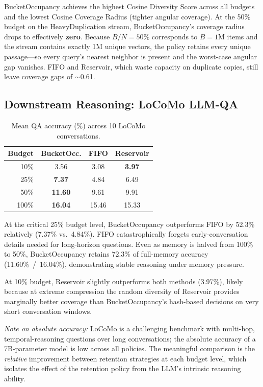 \documentclass[conference]{IEEEtran}
\begin{document}
BucketOccupancy achieves the highest Cosine Diversity Score across all
budgets and the lowest Cosine Coverage Radius (tighter angular
coverage). At the 50\% budget on the HeavyDuplication stream,
BucketOccupancy's coverage radius drops to effectively \textbf{zero}.
Because $B/N{=}50\%$ corresponds to $B{=}1$M items and the stream
contains exactly 1M unique vectors, the policy retains every unique
passage---so every query's nearest neighbor is present and the
worst-case angular gap vanishes. FIFO and Reservoir, which waste
capacity on duplicate copies, still leave coverage gaps of $\sim$0.61.

\subsection{Downstream Reasoning: LoCoMo LLM-QA}

\begin{table}[h]
\centering
\caption{Mean QA accuracy (\%) across 10 LoCoMo conversations.}
\label{tab:locomo}
\begin{tabular}{@{}rccc@{}}
\toprule
Budget & BucketOcc. & FIFO & Reservoir \\
\midrule
 10\% &  3.56 &  3.08 & \textbf{3.97} \\
 25\% & \textbf{7.37} &  4.84 &  6.49 \\
 50\% & \textbf{11.60} &  9.61 &  9.91 \\
100\% & \textbf{16.04} & 15.46 & 15.33 \\
\bottomrule
\end{tabular}
\end{table}

At the critical 25\% budget level, BucketOccupancy outperforms FIFO by
52.3\% relatively (7.37\% vs.\ 4.84\%). FIFO catastrophically forgets
early-conversation details needed for long-horizon questions. Even as
memory is halved from 100\% to 50\%, BucketOccupancy retains 72.3\% of
full-memory accuracy (11.60\%~/~16.04\%), demonstrating stable reasoning
under memory pressure.

At 10\% budget, Reservoir slightly outperforms both methods (3.97\%),
likely because at extreme compression the random diversity of Reservoir
provides marginally better coverage than BucketOccupancy's hash-based
decisions on very short conversation windows.

\textit{Note on absolute accuracy:} LoCoMo is a challenging benchmark
with multi-hop, temporal-reasoning questions over long conversations;
the absolute accuracy of a 7B-parameter model is low across all
policies. The meaningful comparison is the \emph{relative} improvement
between retention strategies at each budget level, which isolates the
effect of the retention policy from the LLM's intrinsic reasoning
ability.
\end{document}
